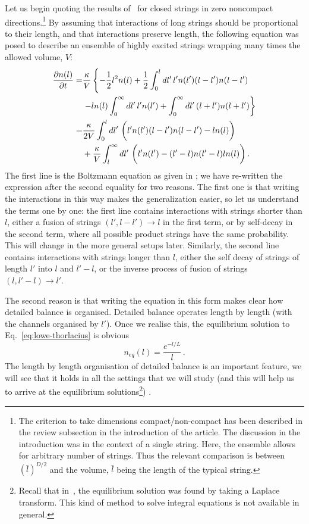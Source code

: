 \documentclass[a4paper,11pt]{article}
\newcommand{\lr}[1]{\left(#1\right)}
\begin{document}
Let us begin quoting the results of~\cite{Lowe:1994nm} for closed strings in zero noncompact directions.\footnote{The criterion to take dimensions compact/non-compact has been described
in the review subsection in the introduction of the article. The discussion  in the introduction was in the context of a single string. Here, the ensemble allows for arbitrary number of strings. Thus the relevant comparison is between  $(\bar{l})^{D/2}$ and the volume, $\bar{l}$ being the
length of the typical string.}
By assuming that interactions of long strings should be proportional to their length, and that interactions preserve length, the following equation was posed to describe an ensemble of highly excited strings wrapping many times the allowed volume, $V$:
\begin{equation}\label{eq:lowe-thorlacius}
\begin{split}
\frac{\partial n(l)}{\partial t}=& \frac{\kappa}{V}\left\{-\frac{1}{2}l^2 n(l)
+\frac{1}{2}\int_0^l dl'\, l'n(l')(l-l')n(l-l') \right.\\
&\left.-ln(l)\int_0^\infty dl'\, l'n(l')+\int_0^\infty dl'\, (l+l')n(l+l')\right\}\\
=&\frac{\kappa}{2V}\int_0^l{dl'\, \lr{l'n(l')(l-l')n(l-l')-ln(l)\vphantom{\frac 12}}}\\ 
 &+\frac{\kappa}{V}\int_l^\infty{dl'\, \lr{l'n(l')-(l'-l)n(l'-l)ln(l)\vphantom{\frac 12}}}\, .
\end{split}
\end{equation}
The first line is the Boltzmann equation as given in \cite{Lowe:1994nm};
we have re-written the expression after the second equality for two reasons.
The first one is that writing the interactions in this way makes the generalization easier, so let us understand the terms one by one: the first line contains interactions with strings shorter than $l$, either a fusion of strings $(l',l-l')\to l$ in the first term, or by self-decay in the second term, where all possible product strings have the same probability.
This will change in the more general setups later.
Similarly, the second line contains interactions with strings longer than $l$, either the self decay of strings of length $l'$ into $l$ and $l'-l$, or the inverse process of fusion of strings $(l,l'-l)\to l'$. 

The second reason is that writing the equation in this form makes clear how detailed balance is organised.
Detailed balance operates length by length  (with the channels organised by $l'$). 
Once we realise this, the equilibrium solution to Eq.~\eqref{eq:lowe-thorlacius} is obvious
\begin{equation}
    n_{eq}(l)=\frac{e^{-l/L}}{l}\, .
\end{equation}
The length by length organisation of detailed balance is an important feature, we will see that it holds in all the settings that we will study
(and this will help us to arrive at the equilibrium solutions\footnote{Recall that in~\cite{Lowe:1994nm}, the equilibrium solution was found by taking a Laplace transform.
This kind of method to solve integral equations is not available in general.}) .
\\
\end{document}
